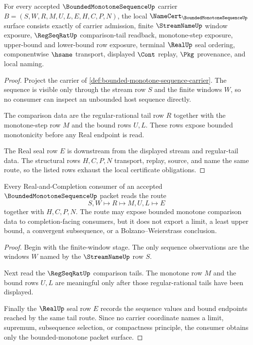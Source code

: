 \begin{theorem}
\label{thm:bounded-monotone-sequence-namecert-obligations}
For every accepted $\BoundedMonotoneSequenceUp$ carrier $B=(S,W,R,M,U,L,E,H,C,P,N)$, the local $\NameCert_{\BoundedMonotoneSequenceUp}$ surface consists exactly of carrier admission, finite $\StreamNameUp$ window exposure, $\RegSeqRatUp$ comparison-tail readback, monotone-step exposure, upper-bound and lower-bound row exposure, terminal $\RealUp$ seal ordering, componentwise $\hsame$ transport, displayed $\Cont$ replay, $\Pkg$ provenance, and local naming.
\end{theorem}
\begin{proof}
Project the carrier of \autoref{def:bounded-monotone-sequence-carrier}. The sequence is visible only through the stream row $S$ and the finite windows $W$, so no consumer can inspect an unbounded host sequence directly.

The comparison data are the regular-rational tail row $R$ together with the monotone-step row $M$ and the bound rows $U,L$. These rows expose bounded monotonicity before any Real endpoint is read.

The Real seal row $E$ is downstream from the displayed stream and regular-tail data. The structural rows $H,C,P,N$ transport, replay, source, and name the same route, so the listed rows exhaust the local certificate obligations.
\end{proof}

\begin{theorem}
\label{thm:bounded-monotone-sequence-comparison-tail-route}
Every Real-and-Completion consumer of an accepted $\BoundedMonotoneSequenceUp$ packet reads the route
$$
S,W
\longmapsto
R
\longmapsto
M,U,L
\longmapsto
E
$$
together with $H,C,P,N$. The route may expose bounded monotone comparison data to completion-facing consumers, but it does not export a limit, a least upper bound, a convergent subsequence, or a Bolzano--Weierstrass conclusion.
\end{theorem}
\begin{proof}
Begin with the finite-window stage. The only sequence observations are the windows $W$ named by the $\StreamNameUp$ row $S$.

Next read the $\RegSeqRatUp$ comparison tails. The monotone row $M$ and the bound rows $U,L$ are meaningful only after those regular-rational tails have been displayed.

Finally the $\RealUp$ seal row $E$ records the sequence values and bound endpoints reached by the same tail route. Since no carrier coordinate names a limit, supremum, subsequence selection, or compactness principle, the consumer obtains only the bounded-monotone packet surface.
\end{proof}

